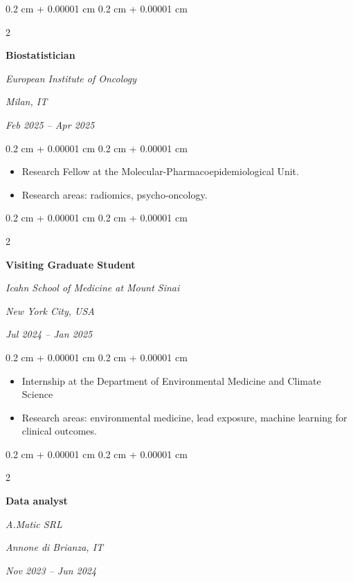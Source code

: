 \documentclass[10pt, letterpaper]{article}
\newenvironment{highlights}{
    \begin{itemize}[
        topsep=0.10 cm,
        parsep=0.10 cm,
        partopsep=0pt,
        itemsep=0pt,
        leftmargin=0.4 cm + 10pt
    ]
}{
    \end{itemize}
} %
\newenvironment{onecolentry}{
    \begin{adjustwidth}{
        0.2 cm + 0.00001 cm
    }{
        0.2 cm + 0.00001 cm
    }
}{
    \end{adjustwidth}
} %
\newenvironment{twocolentry}[2][]{
    \onecolentry
    \def\secondColumn{#2}
    \setcolumnwidth{\fill, 4.5 cm}
    \begin{paracol}{2}
}{
    \switchcolumn \raggedleft \secondColumn
    \end{paracol}
    \endonecolentry
} %
\begin{document}
        \vspace{0.2 cm}

        \begin{twocolentry}{
        \textit{Milan, IT}    
            
        \textit{Feb 2025 – Apr 2025}}
            \textbf{Biostatistician}
            
            \textit{European Institute of Oncology}
        \end{twocolentry}

        \vspace{0.10 cm}
        \begin{onecolentry}
            \begin{highlights}
                \item Research Fellow at the Molecular-Pharmacoepidemiological Unit.
                \item Research areas: radiomics, psycho-oncology.
            \end{highlights}
        \end{onecolentry}

        \vspace{0.2 cm}

        \begin{twocolentry}{
        \textit{New York City, USA}    
            
        \textit{Jul 2024 – Jan 2025}}
            \textbf{Visiting Graduate Student}
            
            \textit{Icahn School of Medicine at Mount Sinai}
        \end{twocolentry}

        \vspace{0.10 cm}
        \begin{onecolentry}
            \begin{highlights}
                \item Internship at the Department of Environmental Medicine and Climate Science
                \item Research areas: environmental medicine, lead exposure, machine learning for clinical outcomes.  
            \end{highlights}
        \end{onecolentry}

        \vspace{0.2 cm}

        \begin{twocolentry}{
        \textit{Annone di Brianza, IT}    
            
        \textit{Nov 2023 – Jun 2024}}
            \textbf{Data analyst}
            
            \textit{A.Matic SRL}
        \end{twocolentry}
\end{document}
